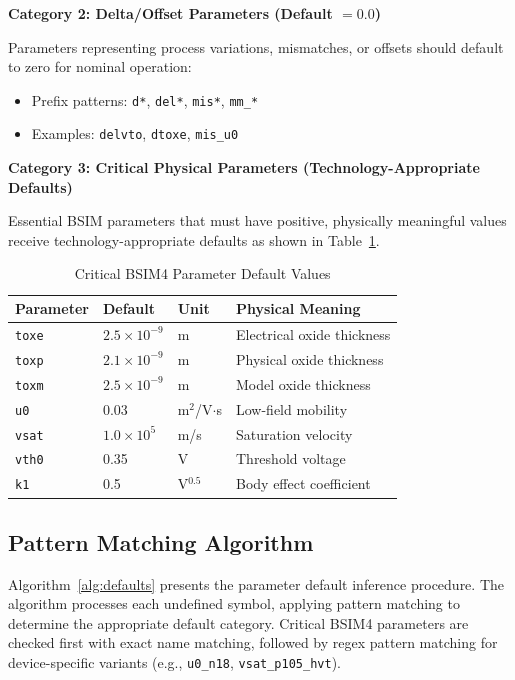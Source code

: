 \documentclass[conference]{IEEEtran}
\begin{document}
\textbf{Category 2: Delta/Offset Parameters (Default $= 0.0$)}

Parameters representing process variations, mismatches, or offsets should default to zero for nominal operation:
\begin{itemize}
\item Prefix patterns: \texttt{d*}, \texttt{del*}, \texttt{mis*}, \texttt{mm\_*}
\item Examples: \texttt{delvto}, \texttt{dtoxe}, \texttt{mis\_u0}
\end{itemize}

\textbf{Category 3: Critical Physical Parameters (Technology-Appropriate Defaults)}

Essential BSIM parameters that must have positive, physically meaningful values receive technology-appropriate defaults as shown in Table~\ref{tab:critical_defaults}.

\begin{table}[!t]
\caption{Critical BSIM4 Parameter Default Values}
\label{tab:critical_defaults}
\centering
\renewcommand{\arraystretch}{1.15}
\begin{tabular}{@{}llll@{}}
\toprule
\textbf{Parameter} & \textbf{Default} & \textbf{Unit} & \textbf{Physical Meaning} \\
\midrule
\texttt{toxe} & $2.5\times10^{-9}$ & m & Electrical oxide thickness \\
\texttt{toxp} & $2.1\times10^{-9}$ & m & Physical oxide thickness \\
\texttt{toxm} & $2.5\times10^{-9}$ & m & Model oxide thickness \\
\texttt{u0} & 0.03 & m$^2$/V$\cdot$s & Low-field mobility \\
\texttt{vsat} & $1.0\times10^{5}$ & m/s & Saturation velocity \\
\texttt{vth0} & 0.35 & V & Threshold voltage \\
\texttt{k1} & 0.5 & V$^{0.5}$ & Body effect coefficient \\
\bottomrule
\end{tabular}
\end{table}

\subsection{Pattern Matching Algorithm}

Algorithm~\ref{alg:defaults} presents the parameter default inference procedure. The algorithm processes each undefined symbol, applying pattern matching to determine the appropriate default category. Critical BSIM4 parameters are checked first with exact name matching, followed by regex pattern matching for device-specific variants (e.g., \texttt{u0\_n18}, \texttt{vsat\_p105\_hvt}).
\end{document}
